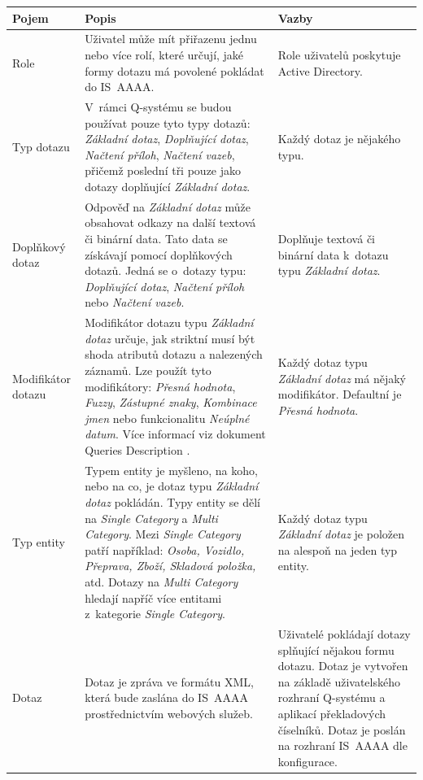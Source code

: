 \documentclass[thesis=M,czech]{FITthesis}[2019/12/23]
\begin{document}
\newpage
\begin{longtable}{|p{}|p{}|p{}|}
		\hline
  		{\textbf{Pojem}} & {\textbf{Popis}} & {\textbf{Vazby}}\\
  		\hline \hline
  		Role & Uživatel může mít přiřazenu jednu nebo více rolí, které určují, jaké formy dotazu má povolené pokládat do IS~AAAA. & Role uživatelů poskytuje Active Directory. \\ \hline
  		Typ dotazu & V~rámci Q-systému se budou používat pouze tyto typy dotazů: \textit{Základní dotaz}, \textit{Doplňující dotaz}, \textit{Načtení příloh}, \textit{Načtení vazeb}, přičemž poslední tři pouze jako dotazy doplňující \textit{Základní dotaz}. & Každý dotaz je nějakého typu. \\ \hline
  		Doplňkový dotaz & Odpověď na \textit{Základní dotaz} může obsahovat odkazy na další textová či binární data. Tato data se získávají pomocí doplňkových dotazů. Jedná se o~dotazy typu: \textit{Doplňující dotaz}, \textit{Načtení příloh} nebo \textit{Načtení vazeb}. & Doplňuje textová či binární data k~dotazu typu \textit{Základní dotaz}. \\ \hline
  		Modifikátor dotazu & Modifikátor dotazu typu \textit{Základní dotaz} určuje, jak striktní musí být shoda atributů dotazu a nalezených záznamů. Lze použít tyto modifikátory: \textit{Přesná hodnota}, \textit{Fuzzy}, \textit{Zástupné znaky}, \textit{Kombinace jmen} nebo funkcionalitu \textit{Neúplné datum}.
Více informací viz dokument Queries Description \cite{Queries}. & Každý dotaz typu \textit{Základní dotaz} má nějaký modifikátor. Defaultní je \textit{Přesná hodnota}. \\ \hline
		Typ entity & Typem entity je myšleno, na koho, nebo na co, je dotaz typu \textit{Základní dotaz} pokládán. Typy entity se dělí na \textit{Single Category} a \textit{Multi Category}. Mezi \textit{Single Category} patří například: \textit{Osoba, Vozidlo, Přeprava, Zboží, Skladová položka,} atd. Dotazy na \textit{Multi Category} hledají napříč více entitami z~kategorie \textit{Single Category}. & Každý dotaz typu \textit{Základní dotaz} je položen na alespoň na jeden typ entity. \\ \hline
		Dotaz & Dotaz je zpráva ve formátu XML, která bude zaslána do IS~AAAA prostřednictvím webových služeb. & Uživatelé pokládají dotazy splňující nějakou formu dotazu. Dotaz je vytvořen na základě uživatelského rozhraní Q-systému a aplikací překladových číselníků. Dotaz je poslán na rozhraní IS~AAAA dle konfigurace. \\ \hline

\end{longtable}
\end{document}
